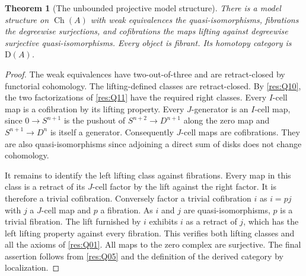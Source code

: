\documentclass[11pt,oneside,openany]{book}
\newtheorem{theorem}{Theorem}[chapter]
\theoremstyle{definition}
\theoremstyle{remark}
\begin{document}
\begin{theorem}[The unbounded projective model structure]\label{res:Q12}
There is a model structure on \(\operatorname{Ch}(A)\)
with weak equivalences the quasi-isomorphisms, fibrations
the degreewise surjections, and cofibrations the maps
lifting against degreewise surjective quasi-isomorphisms.
Every object is fibrant. Its homotopy category is
\(\mathrm D(A)\).
\end{theorem}
\begin{proof}
The weak equivalences have two-out-of-three and are
retract-closed by functorial cohomology. The lifting-defined
classes are retract-closed. By \ref{res:Q10}, the two
factorizations of \ref{res:Q11} have the required right
classes. Every \(I\)-cell map is a cofibration by its
lifting property. Every \(J\)-generator is an \(I\)-cell
map, since \(0\to S^{n+1}\) is the pushout of
\(S^{n+2}\to D^{n+1}\) along the zero map and
\(S^{n+1}\to D^n\) is itself a generator. Consequently
\(J\)-cell maps are cofibrations. They are also
quasi-isomorphisms since adjoining a direct sum of disks
does not change cohomology.

It remains to identify the left lifting class against
fibrations. Every map in this class is a retract of its
\(J\)-cell factor by the lift against the right factor.
It is therefore a trivial cofibration. Conversely
factor a trivial cofibration \(i\) as \(i=pj\) with \(j\)
a \(J\)-cell map and \(p\) a fibration. As \(i\) and \(j\)
are quasi-isomorphisms, \(p\) is a trivial fibration.
The lift furnished by \(i\) exhibits \(i\) as a retract
of \(j\), which has the left lifting property against
every fibration. This verifies both lifting classes and
all the axioms of \ref{res:Q01}. All maps to the zero complex
are surjective. The final assertion follows from \ref{res:Q05}
and the definition of the derived category by localization.
\end{proof}
\end{document}
